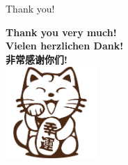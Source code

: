\documentclass[9pt]{beamer}
\begin{document}
\begin{frame}{Thank you!}
	\begin{center}
		\textbf{Thank you very much!} \\
		\textbf{Vielen herzlichen Dank!} \\
		\textbf{\cjkfont 非常感谢你们!} \\
		\includegraphics[width=100pt]{cat.png}
	\end{center}
\end{frame}
\end{document}

